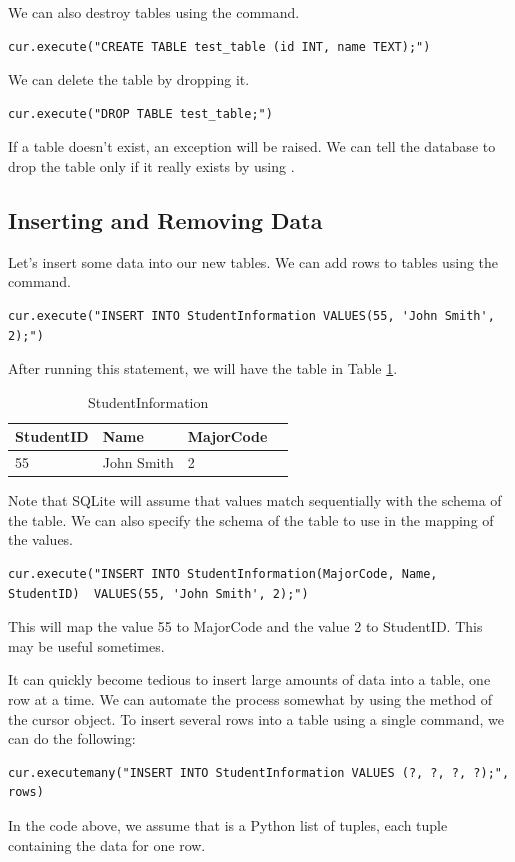 We can also destroy tables using the  command.
\begin{lstlisting}
cur.execute("CREATE TABLE test_table (id INT, name TEXT);")
\end{lstlisting}
We can delete the table by dropping it.
\begin{lstlisting}
cur.execute("DROP TABLE test_table;")
\end{lstlisting}
If a table doesn't exist, an exception will be raised.
We can tell the database to drop the table only if it really exists by using .

\subsection*{Inserting and Removing Data}
Let's insert some data into our new tables.
We can add rows to tables using the  command.
\begin{lstlisting}
cur.execute("INSERT INTO StudentInformation VALUES(55, 'John Smith', 2);")
\end{lstlisting}
After running this statement, we will have the table in Table \ref{table:StudentInformation1}.
\begin{table}
\begin{tabular}{|l|l|l|l|}
\hline
StudentID & Name & MajorCode \\
\hline
55 & John Smith & 2 \\
\hline
\end{tabular}
\caption{StudentInformation}
\label{table:StudentInformation1}
\end{table}

Note that SQLite will assume that values match sequentially with the schema of the table.
We can also specify the schema of the table to use in the mapping of the values.
\begin{lstlisting}
cur.execute("INSERT INTO StudentInformation(MajorCode, Name, StudentID)  VALUES(55, 'John Smith', 2);")
\end{lstlisting}
This will map the value 55 to MajorCode and the value 2 to StudentID.  This may be useful sometimes.

It can quickly become tedious to insert large amounts of data into a table, one row at a time.
We can automate the process somewhat by using the  method of the cursor object.
To insert several rows into a table using a single command, we can do the following:
\begin{lstlisting}
cur.executemany("INSERT INTO StudentInformation VALUES (?, ?, ?, ?);", rows)
\end{lstlisting}
In the code above, we assume that  is a Python list of tuples, each tuple containing the data for one
row.

